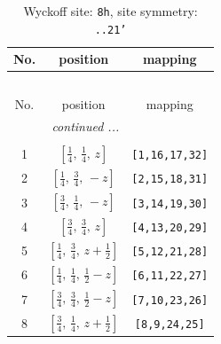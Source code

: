 \documentclass[fleqn,8pt]{jsarticle}
\begin{document}
\begin{longtable}{ccc}
\caption{Wyckoff site: {\tt 8h}, site symmetry: {\tt ..21'}}
 \\
 \hline \hline
No. & position & mapping \\ \hline \endfirsthead

\multicolumn{2}{l}{\tablename\ \thetable{}} \\
 \hline \hline
No. & position & mapping \\ \hline \endhead

 \hline \hline
\multicolumn{2}{r}{\footnotesize\it continued ...} \\ \endfoot

 \hline \hline
\multicolumn{2}{r}{} \\ \endlastfoot

1 & $\left[ \frac{1}{4},\, \frac{1}{4},\, z \right]$ & {\tt [1,16,17,32]} \\ \hline
2 & $\left[ \frac{1}{4},\, \frac{3}{4},\, - z \right]$ & {\tt [2,15,18,31]} \\ \hline
3 & $\left[ \frac{3}{4},\, \frac{1}{4},\, - z \right]$ & {\tt [3,14,19,30]} \\ \hline
4 & $\left[ \frac{3}{4},\, \frac{3}{4},\, z \right]$ & {\tt [4,13,20,29]} \\ \hline
5 & $\left[ \frac{1}{4},\, \frac{3}{4},\, z + \frac{1}{2} \right]$ & {\tt [5,12,21,28]} \\ \hline
6 & $\left[ \frac{1}{4},\, \frac{1}{4},\, \frac{1}{2} - z \right]$ & {\tt [6,11,22,27]} \\ \hline
7 & $\left[ \frac{3}{4},\, \frac{3}{4},\, \frac{1}{2} - z \right]$ & {\tt [7,10,23,26]} \\ \hline
8 & $\left[ \frac{3}{4},\, \frac{1}{4},\, z + \frac{1}{2} \right]$ & {\tt [8,9,24,25]} \\
\end{longtable}
\renewcommand{\arraystretch}{1.2}
\end{document}
